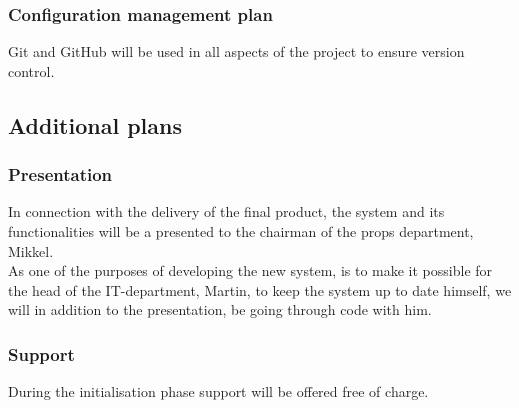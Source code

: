 \documentclass[12pt]{article}
\begin{document}
\subsubsection{Configuration management plan}
Git and GitHub will be used in all aspects of the project to ensure version control.
\subsection{Additional plans}
\subsubsection{Presentation}
In connection with the delivery of the final product, the system and its functionalities will be a presented to the chairman of the props department, Mikkel. \\
As one of the purposes of developing the new system, is to make it possible for the head of the IT-department, Martin, to keep the system up to date himself, we will in addition to the presentation, be going through code with him.
\subsubsection{Support}
During the initialisation phase support will be offered free of charge.
\end{document}

